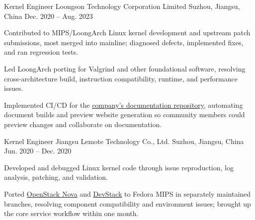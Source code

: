 

\begin{cventries}
  \cventry
    {Kernel Engineer} %
    {Loongson Technology Corporation Limited} %
    {Suzhou, Jiangsu, China} %
    {Dec. 2020 -- Aug. 2023} %
    {
      \begin{cvitems}
        \item {Contributed to MIPS/LoongArch Linux kernel development and upstream patch submissions, most merged into mainline; diagnosed defects, implemented fixes, and ran regression tests.}
        \item {Led LoongArch porting for Valgrind and other foundational software, resolving cross-architecture build, instruction compatibility, runtime, and performance issues.}
        \item {Implemented CI/CD for the \href{https://github.com/FreeFlyingSheep/LoongArch-Documentation}{company's documentation repository}, automating document builds and preview website generation so community members could preview changes and collaborate on documentation.}
      \end{cvitems}
    }

  \cventry
    {Kernel Engineer} %
    {Jiangsu Lemote Technology Co., Ltd.} %
    {Suzhou, Jiangsu, China} %
    {Jun. 2020 -- Dec. 2020} %
    {
      \begin{cvitems}
        \item {Developed and debugged Linux kernel code through issue reproduction, log analysis, patching, and validation.}
        \item {Ported \href{https://github.com/FreeFlyingSheep/nova}{OpenStack Nova} and \href{https://github.com/FreeFlyingSheep/devstack}{DevStack} to Fedora MIPS in separately maintained branches, resolving component compatibility and environment issues; brought up the core service workflow within one month.}
      \end{cvitems}
    }

\end{cventries}
